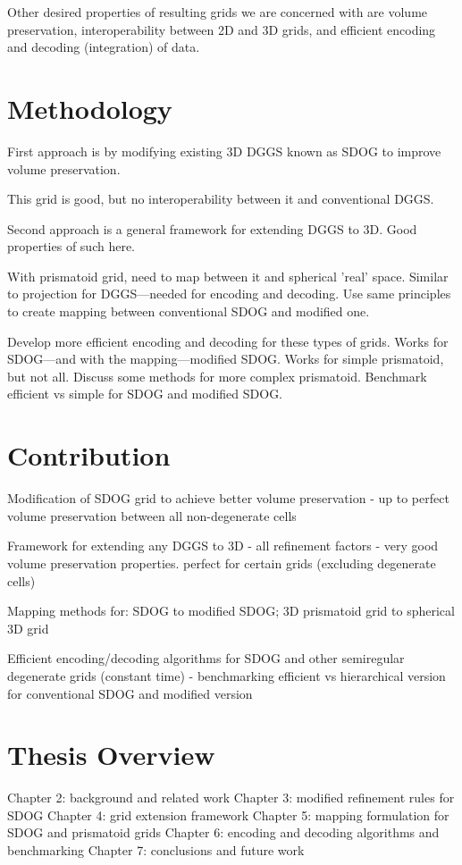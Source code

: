 Other desired properties of resulting grids we are concerned with are volume preservation, interoperability between 2D and 3D grids, and efficient encoding and decoding (integration) of data. 

\section{Methodology}

First approach is by modifying existing 3D DGGS known as SDOG to improve volume preservation.

This grid is good, but no interoperability between it and conventional DGGS.

Second approach is a general framework for extending DGGS to 3D. Good properties of such here.

With prismatoid grid, need to map between it and spherical 'real' space. Similar to projection for DGGS---needed for encoding and decoding. Use same principles to create mapping between conventional SDOG and modified one.

Develop more efficient encoding and decoding for these types of grids. Works for SDOG---and with the mapping---modified SDOG. Works for simple prismatoid, but not all. Discuss some methods for more complex prismatoid. Benchmark efficient vs simple for SDOG and modified SDOG.  

\section{Contribution}

Modification of SDOG grid to achieve better volume preservation
	- up to perfect volume preservation between all non-degenerate cells

Framework for extending any DGGS to 3D
	- all refinement factors
	- very good volume preservation properties. perfect for certain grids (excluding degenerate cells)

Mapping methods for: SDOG to modified SDOG; 3D prismatoid grid to spherical 3D grid

Efficient encoding/decoding algorithms for SDOG and other semiregular degenerate grids (constant time)
 	- benchmarking efficient vs hierarchical version for conventional SDOG and modified version

\section{Thesis Overview}

Chapter 2: background and related work
Chapter 3: modified refinement rules for SDOG
Chapter 4: grid extension framework
Chapter 5: mapping formulation for SDOG and prismatoid grids
Chapter 6: encoding and decoding algorithms and benchmarking
Chapter 7: conclusions and future work

